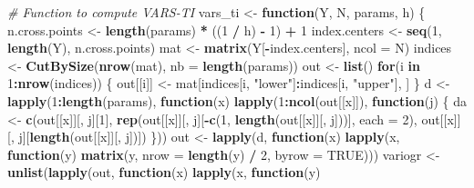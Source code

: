 \documentclass[11pt,]{article}
\newenvironment{Shaded}{\begin{snugshade}}{\end{snugshade}}
\newcommand{\CommentTok}[1]{\textcolor[rgb]{0.56,0.35,0.01}{\textit{#1}}}
\newcommand{\ControlFlowTok}[1]{\textcolor[rgb]{0.13,0.29,0.53}{\textbf{#1}}}
\newcommand{\DataTypeTok}[1]{\textcolor[rgb]{0.13,0.29,0.53}{#1}}
\newcommand{\DecValTok}[1]{\textcolor[rgb]{0.00,0.00,0.81}{#1}}
\newcommand{\KeywordTok}[1]{\textcolor[rgb]{0.13,0.29,0.53}{\textbf{#1}}}
\newcommand{\NormalTok}[1]{#1}
\newcommand{\OperatorTok}[1]{\textcolor[rgb]{0.81,0.36,0.00}{\textbf{#1}}}
\newcommand{\OtherTok}[1]{\textcolor[rgb]{0.56,0.35,0.01}{#1}}
\newcommand{\StringTok}[1]{\textcolor[rgb]{0.31,0.60,0.02}{#1}}
\begin{document}
\begin{Shaded}
\begin{Highlighting}[]
{{\CommentTok{# Function to compute VARS-TI}
\NormalTok{vars_ti <-}\StringTok{ }\ControlFlowTok{function}\NormalTok{(Y, N, params, h) \{}
\NormalTok{  n.cross.points <-}\StringTok{ }\KeywordTok{length}\NormalTok{(params) }\OperatorTok{*}\StringTok{ }\NormalTok{((}\DecValTok{1} \OperatorTok{/}\StringTok{ }\NormalTok{h) }\OperatorTok{-}\StringTok{ }\DecValTok{1}\NormalTok{) }\OperatorTok{+}\StringTok{ }\DecValTok{1}
\NormalTok{  index.centers <-}\StringTok{ }\KeywordTok{seq}\NormalTok{(}\DecValTok{1}\NormalTok{, }\KeywordTok{length}\NormalTok{(Y), n.cross.points)}
\NormalTok{  mat <-}\StringTok{ }\KeywordTok{matrix}\NormalTok{(Y[}\OperatorTok{-}\NormalTok{index.centers], }\DataTypeTok{ncol =}\NormalTok{ N)}
\NormalTok{  indices <-}\StringTok{ }\KeywordTok{CutBySize}\NormalTok{(}\KeywordTok{nrow}\NormalTok{(mat), }\DataTypeTok{nb =} \KeywordTok{length}\NormalTok{(params))}
\NormalTok{  out <-}\StringTok{ }\KeywordTok{list}\NormalTok{()}
  \ControlFlowTok{for}\NormalTok{(i }\ControlFlowTok{in} \DecValTok{1}\OperatorTok{:}\KeywordTok{nrow}\NormalTok{(indices)) \{}
\NormalTok{    out[[i]] <-}\StringTok{ }\NormalTok{mat[indices[i, }\StringTok{"lower"}\NormalTok{]}\OperatorTok{:}\NormalTok{indices[i, }\StringTok{"upper"}\NormalTok{], ]}
\NormalTok{  \}}
\NormalTok{  d <-}\StringTok{ }\KeywordTok{lapply}\NormalTok{(}\DecValTok{1}\OperatorTok{:}\KeywordTok{length}\NormalTok{(params), }\ControlFlowTok{function}\NormalTok{(x) }
    \KeywordTok{lapply}\NormalTok{(}\DecValTok{1}\OperatorTok{:}\KeywordTok{ncol}\NormalTok{(out[[x]]), }\ControlFlowTok{function}\NormalTok{(j) \{}
\NormalTok{      da <-}\StringTok{ }\KeywordTok{c}\NormalTok{(out[[x]][, j][}\DecValTok{1}\NormalTok{], }
              \KeywordTok{rep}\NormalTok{(out[[x]][, j][}\OperatorTok{-}\KeywordTok{c}\NormalTok{(}\DecValTok{1}\NormalTok{, }\KeywordTok{length}\NormalTok{(out[[x]][, j]))], }\DataTypeTok{each =} \DecValTok{2}\NormalTok{), }
\NormalTok{              out[[x]][, j][}\KeywordTok{length}\NormalTok{(out[[x]][, j])])}
\NormalTok{    \}))}
\NormalTok{  out <-}\StringTok{ }\KeywordTok{lapply}\NormalTok{(d, }\ControlFlowTok{function}\NormalTok{(x) }\KeywordTok{lapply}\NormalTok{(x, }\ControlFlowTok{function}\NormalTok{(y) }\KeywordTok{matrix}\NormalTok{(y, }\DataTypeTok{nrow =} \KeywordTok{length}\NormalTok{(y) }\OperatorTok{/}\StringTok{ }\DecValTok{2}\NormalTok{, }\DataTypeTok{byrow =} \OtherTok{TRUE}\NormalTok{)))}
\NormalTok{  variogr <-}\StringTok{ }\KeywordTok{unlist}\NormalTok{(}\KeywordTok{lapply}\NormalTok{(out, }\ControlFlowTok{function}\NormalTok{(x) }\KeywordTok{lapply}\NormalTok{(x, }\ControlFlowTok{function}\NormalTok{(y) }
}}
\end{Highlighting}
\end{Shaded}
\end{document}
